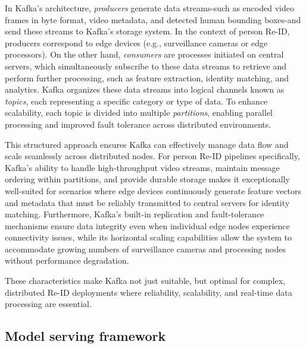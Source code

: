 \documentclass[../main.tex]{subfiles}
\begin{document}
In Kafka's architecture, \textit{producers} generate data streams-such as encoded video frames in byte format, video metadata, and detected human bounding boxes-and send these streams to Kafka's storage system. In the context of person Re-ID, producers correspond to edge devices (e.g., surveillance cameras or edge processors). On the other hand, \textit{consumers} are processes initiated on central servers, which simultaneously subscribe to these data streams to retrieve and perform further processing, such as feature extraction, identity matching, and analytics. Kafka organizes these data streams into logical channels known as \textit{topics}, each representing a specific category or type of data. To enhance scalability, each topic is divided into multiple \textit{partitions}, enabling parallel processing and improved fault tolerance across distributed environments. 

This structured approach ensures Kafka can effectively manage data flow and scale seamlessly across distributed nodes. For person Re-ID pipelines specifically, Kafka's ability to handle high-throughput video streams, maintain message ordering within partitions, and provide durable storage makes it exceptionally well-suited for scenarios where edge devices continuously generate feature vectors and metadata that must be reliably transmitted to central servers for identity matching. Furthermore, Kafka's built-in replication and fault-tolerance mechanisms ensure data integrity even when individual edge nodes experience connectivity issues, while its horizontal scaling capabilities allow the system to accommodate growing numbers of surveillance cameras and processing nodes without performance degradation. 

These characteristics make Kafka not just suitable, but optimal for complex, distributed Re-ID deployments where reliability, scalability, and real-time data processing are essential.

\subsection{Model serving framework}
\label{sec:model_serving_framework}
\end{document}
